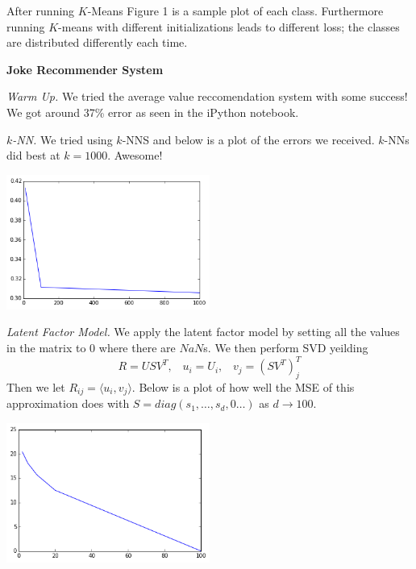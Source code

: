\documentclass[letter]{article}
\newenvironment{menumerate}{%
  \edef\backupindent{\the\parindent}%
  \enumerate%
  \setlength{\parindent}{\backupindent}%
}{\endenumerate}
\begin{document}
\begin{menumerate}
\begin{menumerate}
\begin{figure}
  \end{figure}
    \item After running $K$-Means Figure 1 is a sample plot of each class. Furthermore running $K$-means with different initializations leads to different loss; the classes are distributed differently each time.
  \end{menumerate}
  \item \textbf{Joke Recommender System}
  \begin{menumerate}
  \item \emph{Warm Up.} We tried the average value reccomendation system with some success! We got around 37\% error as seen in the iPython notebook. 
  \item \emph{$k$-NN.} We tried using $k$-NNS and below is a plot of the errors we received. $k$-NNs did best at $k=1000$. Awesome!

  \begin{center}
  \includegraphics[width=0.5\textwidth]{knn_improve.png}
  \end{center}


    \item \emph{Latent Factor Model.} We apply the latent factor model by setting all the values in the matrix to $0$ where there are $NaN$s. We then perform SVD yeilding
  \begin{equation}
    R = USV^T,\;\;\;u_i = U_i,\;\;\;v_j = (SV^T)^T_j 
  \end{equation}
  Then we let $R_{ij} = \langle u_i, v_j \rangle$. Below is a plot of how well the MSE of this approximation does 
  with $S = diag(s_1, \dots, s_d, 0 \dots)$ as $d \to 100$.

  \begin{center}
  \includegraphics[width=0.5\textwidth]{training_svd.png}
  \end{center}


\end{menumerate}
\end{menumerate}
\end{document}
